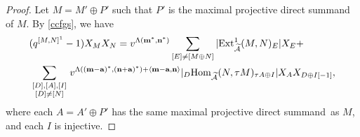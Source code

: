 \documentclass[reqno,12pt]{amsart}
\numberwithin{equation}{section}
\def\Ext{\mbox{\rm Ext}} \def\Hom{\mbox{\rm Hom}} \def\dim{\mbox{\rm dim}} \def\Iso{\mbox{\rm Iso}\,}\def\Ind{\mbox{\rm Ind}\,}
\def\lr#1{\langle #1\rangle} \def\fin{\hfill$\square$}  \def\lra{\longrightarrow} \def\mod{\mbox{\rm \textbf{mod}}\,}\def\Mod{\mbox{\rm mod}\,}\def\top{\mbox{\rm top}\,}\def\soc{\mbox{\rm soc}\,}
\theoremstyle{plain} %
\theoremstyle{definition} %
\begin{document}
\begin{proof}
Let $M=M'\oplus P'$ such that $P'$ is the maximal projective direct summand of $M$. By \eqref{ccfgs}, we have
\begin{equation}\label{diyibu}
\begin{split}
&(q^{[M,N]^1}-1)X_M X_N=v^{\Lambda({\bf m}^*,{\bf n}^*)}\sum\limits_{[E]\neq [M\oplus N]}
|\Ext_{\widetilde{\A}}^1(M,N)_E|X_E+\\&\sum\limits_{\begin{smallmatrix}[D],[A],[I]\\ [D]\neq [N]\end{smallmatrix}}v^{\Lambda(({\bf m}-{{\bf a}})^*,{({\bf n}+{\bf a})}^*)+\lr{{{\bf m}}-{{\bf a}},{\bf n}}}|_D\Hom_{\widetilde{\A}}(N,\tau M)_{\tau A\oplus I}|X_{A} X_{D\oplus I[-1]},
\end{split}\end{equation}
where each $A=A'\oplus P'$ has the same maximal projective direct summand~as $M$, and each $I$ is injective.


\end{proof}
\end{document}
